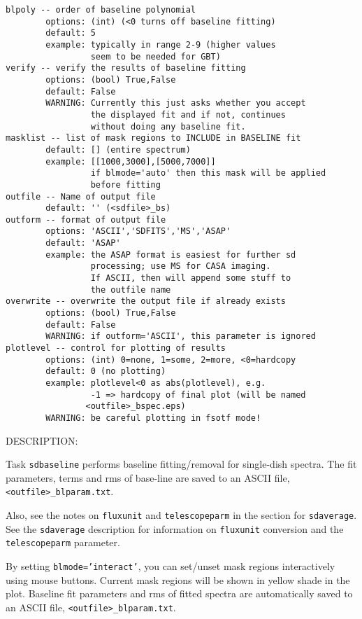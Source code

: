 \begin{verbatim}
blpoly -- order of baseline polynomial
        options: (int) (<0 turns off baseline fitting)
        default: 5
        example: typically in range 2-9 (higher values
                 seem to be needed for GBT)
verify -- verify the results of baseline fitting
        options: (bool) True,False
        default: False
        WARNING: Currently this just asks whether you accept
                 the displayed fit and if not, continues
                 without doing any baseline fit.
masklist -- list of mask regions to INCLUDE in BASELINE fit
        default: [] (entire spectrum)
        example: [[1000,3000],[5000,7000]]
                 if blmode='auto' then this mask will be applied
                 before fitting
outfile -- Name of output file
        default: '' (<sdfile>_bs)
outform -- format of output file
        options: 'ASCII','SDFITS','MS','ASAP'
        default: 'ASAP'
        example: the ASAP format is easiest for further sd
                 processing; use MS for CASA imaging.
                 If ASCII, then will append some stuff to
                 the outfile name
overwrite -- overwrite the output file if already exists
        options: (bool) True,False
        default: False
        WARNING: if outform='ASCII', this parameter is ignored
plotlevel -- control for plotting of results
        options: (int) 0=none, 1=some, 2=more, <0=hardcopy
        default: 0 (no plotting)
        example: plotlevel<0 as abs(plotlevel), e.g.
                 -1 => hardcopy of final plot (will be named
                <outfile>_bspec.eps)
        WARNING: be careful plotting in fsotf mode!

\end{verbatim}

    DESCRIPTION:

    Task {\tt sdbaseline} performs baseline fitting/removal for single-dish spectra.
    The fit parameters, terms and rms of base-line are saved to an ASCII
    file, {\tt <outfile>\_blparam.txt}.

    Also, see the notes on {\tt fluxunit} and {\tt telescopeparm} in the section for
    {\tt sdaverage}.
    See the {\tt sdaverage} description for information on {\tt fluxunit} 
    conversion and the {\tt telescopeparm} parameter.

    By setting {\tt blmode='interact'}, you can set/unset mask regions interactively using
    mouse buttons. Current mask regions will be shown in yellow shade in the plot.
    Baseline fit parameters and rms of fitted spectra are automatically saved to an
    ASCII file, {\tt <outfile>\_blparam.txt}.

